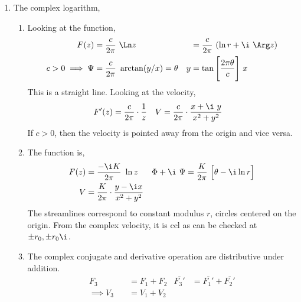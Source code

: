 \begin{enumerate}
    \item The complex logarithm,
          \begin{enumerate}
              \item Looking at the function,
                    \begin{align}
                        F(z)                & = \frac{c}{2\pi}\ \Ln z                &
                                            & = \frac{c}{2\pi}\ (\ln r + \i\ \Arg z)   \\
                        c > 0 \implies \Psi & = \frac{c}{2\pi}\ \arctan(y/x)
                        = \theta            &
                        y                   & = \tan\Bigg[\frac{2\pi \theta}{c}
                            \Bigg]\ x
                    \end{align}
                    This is a straight line. Looking at the velocity,
                    \begin{align}
                        F'(z) & = \frac{c}{2\pi} \cdot \frac{1}{z}                 &
                        V     & = \frac{c}{2\pi} \cdot \frac{x + \i\ y}{x^2 + y^2}
                    \end{align}
                    If $ c > 0 $, then the velocity is pointed away from the origin and
                    vice versa.

              \item The function is,
                    \begin{align}
                        F(z)            & = \frac{-\i K}{2\pi}\ \ln{z}           &
                        \Phi + \i\ \Psi & = \frac{K}{2\pi}\ \Big[ \theta
                        - \i \ln r\Big]                                            \\
                        V               & = \frac{K}{2\pi} \cdot \frac{y - \i x}
                        {x^2 + y^2}
                    \end{align}
                    The streamlines correspond to constant modulus $ r $, circles
                    centered on the origin. From the complex velocity, it is ccl
                    as can be checked at $ \pm r_0, \pm r_0\i $.

              \item The complex conjugate and derivative operation are distributive
                    under addition.
                    \begin{align}
                        F_3                & = F_1 + F_2                         &
                        \overline{F_3'}    & = \overline{F_1'} + \overline{F_2'}   \\
                        \implies V_3 \quad & = V_1 + V_2
                    \end{align}



\end{enumerate}
\end{enumerate}
